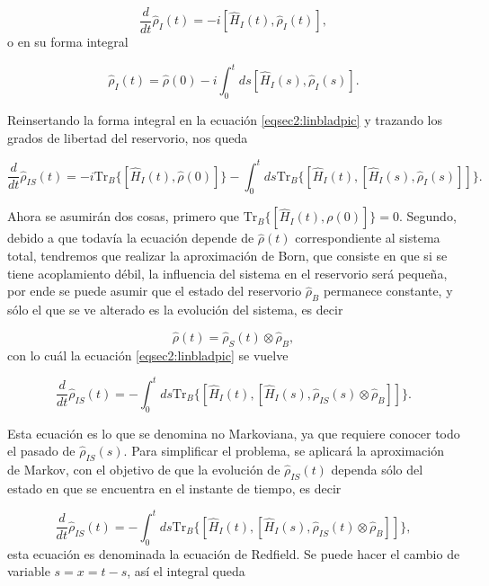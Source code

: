 \begin{equation}
    \frac{d}{dt}\hat{\rho}_{I}(t) = -i[\hat{H}_{I}(t), \hat{\rho}_{I}(t)],
    \label{eqsec2:linbladpic}
\end{equation}
o en su forma integral

\begin{equation*}
    \hat{\rho}_{I}(t) = \hat{\rho}(0) - i \int_{0}^{t} ds[\hat{H}_{I}(s), \hat{\rho}_{I}(s)].
\end{equation*}

Reinsertando la forma integral en la ecuación \ref{eqsec2:linbladpic} y trazando los grados de libertad del reservorio, nos queda

\begin{equation}
    \frac{d}{dt}\hat{\rho}_{IS}(t) = -i \text{Tr}_{B}\{[\hat{H}_{I}(t),\hat{\rho}(0)] \}  -  \int_{0}^{t}ds \text{Tr}_{B}\{[\hat{H}_{I}(t), [\hat{H}_{I}(s),\hat{\rho}_{I}(s)]]\}.
\end{equation}

Ahora se asumirán dos cosas, primero que $\text{Tr}_{B}\{[\hat{H}_{I}(t),\rho(0)] \} = 0$. Segundo, debido a que todavía la ecuación depende de $\hat{\rho}(t)$ correspondiente al sistema total, tendremos que realizar la aproximación de Born, que consiste en que si se tiene acoplamiento débil, la influencia del sistema en el reservorio será pequeña, por ende se puede asumir que el estado del reservorio $\hat{\rho}_{B}$ permanece constante, y sólo el que se ve alterado es la evolución del sistema, es decir

\begin{equation*}
    \hat{\rho}(t) = \hat{\rho}_{S}(t)\otimes \hat{\rho}_{B},
\end{equation*}
con lo cuál la ecuación \ref{eqsec2:linbladpic} se vuelve

\begin{equation}
    \frac{d}{dt}\hat{\rho}_{IS}(t) = -  \int_{0}^{t}ds \text{Tr}_{B}\{[\hat{H}_{I}(t), [\hat{H}_{I}(s),\hat{\rho}_{IS}(s) \otimes \hat{\rho}_{B}]]\}.
\end{equation} 

Esta ecuación es lo que se denomina no Markoviana, ya que requiere conocer todo el pasado de $\hat{\rho}_{IS}(s)$. Para simplificar el problema, se aplicará la aproximación de Markov, con el objetivo de que la evolución de $\hat{\rho}_{IS}(t)$ dependa sólo del estado en que se encuentra en el instante de tiempo, es decir

\begin{equation*}
    \frac{d}{dt}\hat{\rho}_{IS}(t) = -  \int_{0}^{t}ds \text{Tr}_{B}\{[\hat{H}_{I}(t), [\hat{H}_{I}(s),\hat{\rho}_{IS}(t) \otimes \hat{\rho}_{B}]]\},
\end{equation*} 
esta ecuación es denominada la ecuación de Redfield. Se puede hacer el cambio de variable $s= x = t-s$, así el integral queda


